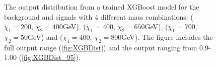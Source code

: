 \begin{figure}
    \caption{The output distribution from a trained XGBoost model for the background and signals with 4 different mass combinations:
    ($\tilde{\chi}_1=200$, $\tilde{\chi}_2=400$GeV), ($\tilde{\chi}_1=400$, $\tilde{\chi}_2=650$GeV), 
    ($\tilde{\chi}_1=700$, $\tilde{\chi}_2=50$GeV) and ($\tilde{\chi}_1=400$, $\tilde{\chi}_2=800$GeV). 
    The figure includes the full output range (\ref{fig:XGBDist}) and the output ranging from 0.9-1.00 (\ref{fig:XGBDist_95}).}
    \label{fig:XGBDistComp}
\end{figure}
